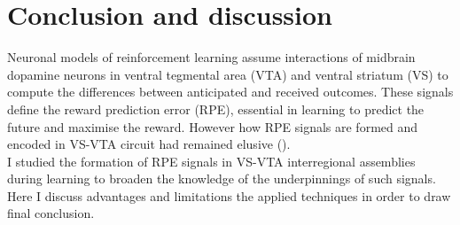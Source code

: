 \chapter{Conclusion and discussion}
\label{chap:Conclusion}
Neuronal models of reinforcement learning assume interactions of midbrain dopamine neurons in ventral tegmental area (VTA) and ventral striatum (VS) to compute the differences between anticipated and received outcomes. These signals define the reward prediction error (RPE), essential in learning to predict the future and maximise the reward. However how RPE signals are formed and encoded in VS-VTA circuit had remained elusive (\cite{Schultz2016}).\\I studied the formation of RPE signals in VS-VTA interregional assemblies during learning to broaden the knowledge of the underpinnings of such signals. Here I discuss advantages and limitations the applied techniques in order to draw final conclusion.
